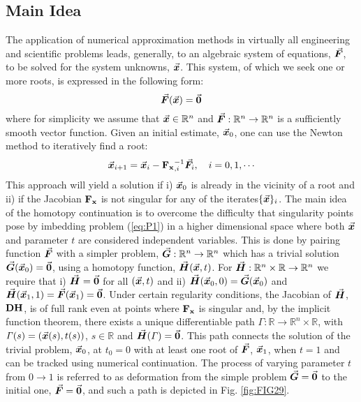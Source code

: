 \subsection{Main Idea}\label{CH4-S1SS1}

The application of numerical approximation methods in virtually all engineering
and scientific problems leads, generally, to an algebraic system of equations,
$\vec{\bm{F}}$, to
be solved for the system unknowns, $\vec{\bm{x}}$. This system, of which we seek one
or more roots, is expressed in the following form:
\begin{equation}
\vec{\bm{F}}(\vec{\bm{x}})=\vec{\bm{0}}
\label{eq:P1}
\end{equation}
where for simplicity we assume that $\vec{\bm{x}}\in\mathbb{R}^n$ and
$\vec{\bm{F}}:\mathbb{R}^n\rightarrow\mathbb{R}^n$ is a
sufficiently smooth vector function. Given 
an initial estimate, $\vec{\bm{x}}_0$,
one can use the Newton method to iteratively find a root:
\begin{equation}
\bvec{x}_{i+1} = \bvec{x}_i-\bmat{F_x}^{-1}_{,i}\bvec{F}_i,\quad i=0,1,\cdots
\label{eq:NEWTON}
\end{equation}
This approach will yield a solution if i) $\vec{\bm{x}}_0$ is already in the 
vicinity
of a root and ii) if the Jacobian $\mathbf{F_x}$ is not singular for any of 
the iterates$\{\vec{\bm{x}}\}_i$. The main idea of the homotopy continuation is to 
overcome the difficulty that
singularity points pose by imbedding problem (\ref{eq:P1}) in a higher
dimensional space where both $\vec{\bm{x}}$ and parameter $t$ are considered 
independent variables.
This is done by pairing function $\vec{\bm{F}}$ with a simpler problem,
$\vec{\bm{G}}:\mathbb{R}^n\rightarrow\mathbb{R}^n$ which has a trivial solution 
$\vec{\bm{G}}(\vec{\bm{x}}_0)=\vec{\bm{0}}$, using a homotopy function, 
$\vec{\bm{H}}(\vec{\bm{x}},t)$. 
For $\vec{\bm{H}}:\mathbb{R}^n\times\mathbb{R}\rightarrow \mathbb{R}^n$ we require
that
i) $\vec{\bm{H}}=\vec{\bm{0}}$ for all $(\vec{\bm{x}},t)$ and ii)
$\vec{\bm{H}}(\vec{\bm{x}}_0,0)=\vec{\bm{G}}(\vec{\bm{x}}_0)$ and
$\vec{\bm{H}}(\vec{\bm{x}}_1,1)=\vec{\bm{F}}(\vec{\bm{x}}_1)=\vec{\bm{0}}$. Under certain 
regularity 
conditions, the Jacobian of
$\vec{\bm{H}}$, $\mathbf{DH}$, is of full rank even at points where $\mathbf{F_x}$ 
is
singular and, by the implicit function theorem, there exists a unique 
differentiable path
$\mathit{\Gamma}:\mathbb{R}\rightarrow\mathbb{R}^{n}\times\mathbb{R}$, 
with $\mathit{\Gamma}(s)=(\vec{\bm{x}}(s),t(s))$, $s\in\mathbb{R}$ and
$\vec{\bm{H}}(\mathit{\Gamma})=\vec{\bm{0}}$.
This path connects the solution of the trivial problem, $\vec{\bm{x}}_0$, at $t_0=0$
with at least one root of $\vec{\bm{F}}$, $\vec{\bm{x}}_1$, when $t=1$ and can be
tracked using numerical continuation\cite{Allgower:2003}. The process of 
varying parameter $t$ from $0\rightarrow 1$
is referred to as deformation from the simple problem $\vec{\bm{G}}=\vec{\bm{0}}$ to 
the initial one, $\vec{\bm{F}}=\vec{\bm{0}}$, and such a path is depicted in Fig. 
\ref{fig:FIG29}.

